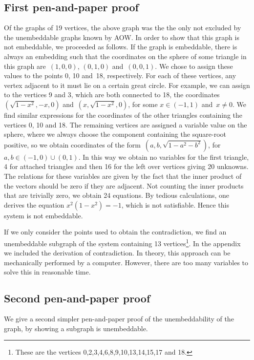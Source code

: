 \documentclass{report}
\begin{document}
\subsection{First pen-and-paper proof}
Of the graphs of 19 vertices,
the above graph was the
the only not excluded by the unembeddable graphs
known by AOW.
In order to show that this graph is not embeddable,
we proceeded as follows.
If the graph is embeddable, there is always an embedding such that
the coordinates on the sphere of some triangle in this graph
are~$(1,0,0)$, $(0,1,0)$ and~$(0,0,1)$.
We chose to assign these values
to the points 0, 10 and~18, respectively. For each of these vertices,
any vertex adjacent to it
must lie on a certain great circle.
For example, we can assign to the vertices 9 and 3, which
are both connected to 18, the coordinates~$(\sqrt{1-x^{2}}, -x,0)$
and~$(x,\sqrt{1-x^{2}},0)$, for some $x\in(-1,1)$ and~$x\neq 0$.
We find similar
expressions for the coordinates of the other triangles containing the
vertices 0, 10 and 18. The remaining vertices are assigned a variable
value on the sphere, where we always choose the component containing
the square-root positive, so we obtain coordinates of the
form~$(a,b,\sqrt{1-a^2-b^2})$, for $a,b \in (-1,0)\cup (0,1)$.
In this way we
obtain no variables for the first triangle, 4 for attached triangles
and then 16 for the left over vertices giving 20 unknowns. The
relations for these variables are given by the fact that the inner
product of the vectors should be zero if they are adjacent. Not
counting the inner products that are trivially zero, we obtain 24
equations. By tedious calculations, one
derives the equation $x^2(1-x^2) = -1$, which is not satisfiable.
Hence this system is not embeddable.

If we only consider the points used to obtain the
contradiction, we find an unembeddable subgraph of the system
containing 13 vertices\footnote{These are the vertices
0,2,3,4,6,8,9,10,13,14,15,17 and 18.}.
In the appendix we included the  derivation of contradiction.
In theory, this approach can be mechanically performed by
a computer.  However, there are too many variables
to solve this in reasonable time.

\subsection{Second pen-and-paper proof}
We give a second simpler pen-and-paper proof of the unembeddability
of the graph, by showing a subgraph is unembeddable.
\end{document}
